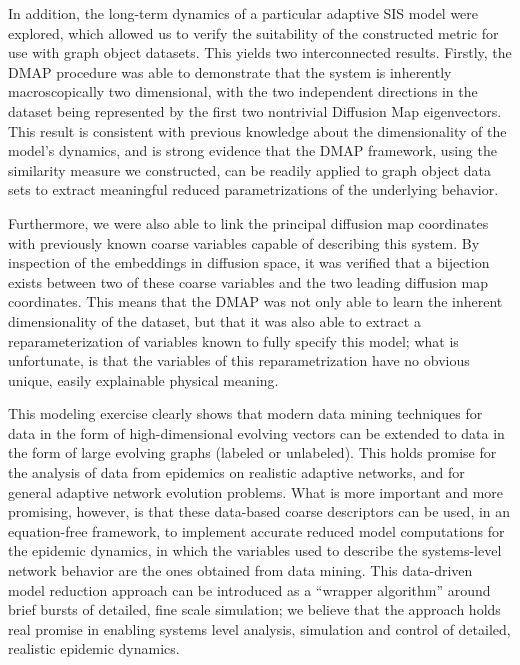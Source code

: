 In addition, the long-term dynamics of a particular adaptive SIS model
were explored, which allowed us to verify the suitability of the
constructed metric for use with graph object datasets. This yields two
interconnected results. Firstly, the DMAP procedure was able to
demonstrate that the system is inherently macroscopically two
dimensional, with the two independent directions in the dataset being
represented by the first two nontrivial Diffusion Map
eigenvectors. This result is consistent with previous knowledge about
the dimensionality of the model’s dynamics, and is strong evidence
that the DMAP framework, using the similarity measure we constructed,
can be readily applied to graph object data sets to extract meaningful
reduced parametrizations of the underlying behavior.

Furthermore, we were also able to link the principal diffusion map
coordinates with previously known coarse variables capable of
describing this system. By inspection of the embeddings in diffusion
space, it was verified that a bijection exists between two of these
coarse variables and the two leading diffusion map coordinates. This
means that the DMAP was not only able to learn the inherent
dimensionality of the dataset, but that it was also able to extract a
reparameterization of variables known to fully specify this model;
what is unfortunate, is that the variables of this reparametrization
have no obvious unique, easily explainable physical meaning.

This modeling exercise clearly shows that modern data mining
techniques for data in the form of high-dimensional evolving vectors
can be extended to data in the form of large evolving graphs (labeled
or unlabeled). This holds promise for the analysis of data from
epidemics on realistic adaptive networks, and for general adaptive
network evolution problems. What is more important and more promising,
however, is that these data-based coarse descriptors can be used, in
an equation-free framework, to implement accurate reduced model
computations for the epidemic dynamics, in which the variables used to
describe the systems-level network behavior are the ones obtained from
data mining. This data-driven model reduction approach can be
introduced as a “wrapper algorithm” around brief bursts of detailed,
fine scale simulation; we believe that the approach holds real promise
in enabling systems level analysis, simulation and control of
detailed, realistic epidemic dynamics.


